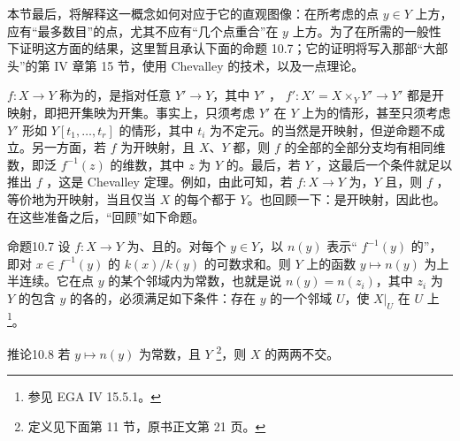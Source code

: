 本节最后，将解释这一概念如何对应于它的直观图像：在所考虑的点 $y\in Y$ 上方，应有“最多数目”的点，尤其不应有“几个点重合”在 $y$ 上方。为了在所需的一般性下证明这方面的结果，这里暂且承认下面的命题 10.7；它的证明将写入那部“大部头”的第 IV 章第 15 节，使用 Chevalley 的技术，以及一点理论。

 $f\colon X\to Y$ 称为的，是指对任意 $Y'\to Y$，其中 $Y'$ ， $f'\colon X'=X\times_Y Y'\to Y'$ 都是开映射，即把开集映为开集。事实上，只须考虑 $Y'$ 在 $Y$ 上为的情形，甚至只须考虑 $Y'$ 形如 $Y[t_1,\ldots,t_r]$ 的情形，其中 $t_i$ 为不定元。的当然是开映射，但逆命题不成立。另一方面，若 $f$ 为开映射，且 $X$、$Y$ 都，则 $f$ 的全部的全部分支均有相同维数，即泛 $f^{-1}(z)$ 的维数，其中 $z$ 为 $Y$ 的。最后，若 $Y$ ，这最后一个条件就足以推出 $f$ ，这是 Chevalley 定理。例如，由此可知，若 $f\colon X\to Y$ 为，$Y$ 且，则 $f$ ，等价地为开映射，当且仅当 $X$ 的每个都于 $Y$。也回顾一下：是开映射，因此也。在这些准备之后，“回顾”如下命题。
\begin{SGAresult}{命题}{10.7}
设 $f\colon X\to Y$ 为、且的。对每个 $y\in Y$，以 $n(y)$ 表示“ $f^{-1}(y)$ 的”，即对 $x\in f^{-1}(y)$ 的 $k(x)/k(y)$ 的可数求和。则 $Y$ 上的函数 $y\mapsto n(y)$ 为上半连续。它在点 $y$ 的某个邻域内为常数，也就是说 $n(y)=n(z_i)$，其中 $z_i$ 为 $Y$ 的包含 $y$ 的各的，必须满足如下条件：存在 $y$ 的一个邻域 $U$，使 $X|_U$ 在 $U$ 上\footnote{参见 EGA IV 15.5.1。}。
\end{SGAresult}
\begin{SGAresult}{推论}{10.8}
若 $y\mapsto n(y)$ 为常数，且 $Y$ \footnote{定义见下面第 11 节，原书正文第 21 页。}，则 $X$ 的两两不交。
\end{SGAresult}
